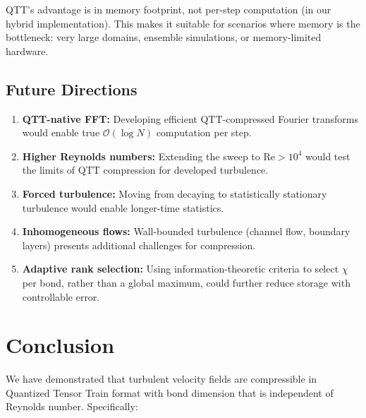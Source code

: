 \documentclass[preprint,12pt,authoryear]{elsarticle}
\newcommand{\bigO}{\mathcal{O}}
\theoremstyle{definition}
\begin{document}
QTT's advantage is in memory footprint, not per-step computation (in our hybrid implementation).
This makes it suitable for scenarios where memory is the bottleneck: very large domains, ensemble simulations, or memory-limited hardware.

\subsection{Future Directions}

\begin{enumerate}
    \item \textbf{QTT-native FFT:} Developing efficient QTT-compressed Fourier transforms would enable true $\bigO(\log N)$ computation per step.
    
    \item \textbf{Higher Reynolds numbers:} Extending the sweep to $\mathrm{Re} > 10^4$ would test the limits of QTT compression for developed turbulence.
    
    \item \textbf{Forced turbulence:} Moving from decaying to statistically stationary turbulence would enable longer-time statistics.
    
    \item \textbf{Inhomogeneous flows:} Wall-bounded turbulence (channel flow, boundary layers) presents additional challenges for compression.
    
    \item \textbf{Adaptive rank selection:} Using information-theoretic criteria to select $\chi$ per bond, rather than a global maximum, could further reduce storage with controllable error.
\end{enumerate}

\section{Conclusion}
\label{sec:conclusion}

We have demonstrated that turbulent velocity fields are compressible in Quantized Tensor Train format with bond dimension that is independent of Reynolds number.
Specifically:
\end{document}
